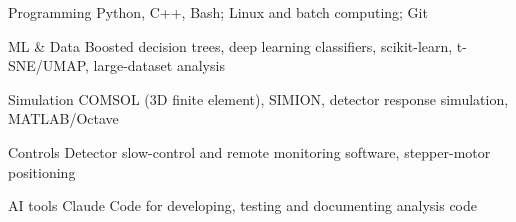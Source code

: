 
\begin{cvskills}

  \cvskill
    {Programming}
    {Python, C++, Bash; Linux and batch computing; Git}

  \cvskill
    {ML \& Data}
    {Boosted decision trees, deep learning classifiers, scikit-learn, t-SNE/UMAP, large-dataset analysis}

  \cvskill
    {Simulation}
    {COMSOL (3D finite element), SIMION, detector response simulation, MATLAB/Octave}

  \cvskill
    {Controls}
    {Detector slow-control and remote monitoring software, stepper-motor positioning}

  \cvskill
    {AI tools}
    {Claude Code for developing, testing and documenting analysis code}

\end{cvskills}
